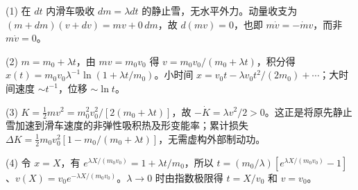 (1) 在 \(dt\) 内滑车吸收 \(dm=\lambda dt\) 的静止雪，无水平外力。动量收支为 \((m+dm)(v+dv)=mv+0\,dm\)，故 \(d(mv)=0\)，也即 \(m\dot v=-\dot m v\)，而非 \(m\dot v=0\)。

(2) \(m=m_0+\lambda t\)，由 \(mv=m_0v_0\) 得 \(v=m_0v_0/(m_0+\lambda t)\)，积分得 \(x(t)=m_0v_0\lambda^{-1}\ln(1+\lambda t/m_0)\)。小时间 \(x=v_0t-\lambda v_0t^2/(2m_0)+\cdots\)；大时间速度 \(\sim t^{-1}\)，位移 \(\sim\ln t\)。

(3) \(K=\tfrac12mv^2=m_0^2v_0^2/[2(m_0+\lambda t)]\)，故 \(-\dot K=\lambda v^2/2>0\)。这正是将原先静止雪加速到滑车速度的非弹性吸积热及形变能率；累计损失 \(\Delta K=\tfrac12m_0v_0^2[1-m_0/(m_0+\lambda t)]\)，无需虚构外部制动功。

(4) 令 \(x=X\)，有 \(e^{\lambda X/(m_0v_0)}=1+\lambda t/m_0\)，所以 \(t=(m_0/\lambda)[e^{\lambda X/(m_0v_0)}-1]\)、\(v(X)=v_0e^{-\lambda X/(m_0v_0)}\)。\(\lambda\to0\) 时由指数极限得 \(t=X/v_0\) 和 \(v=v_0\)。
